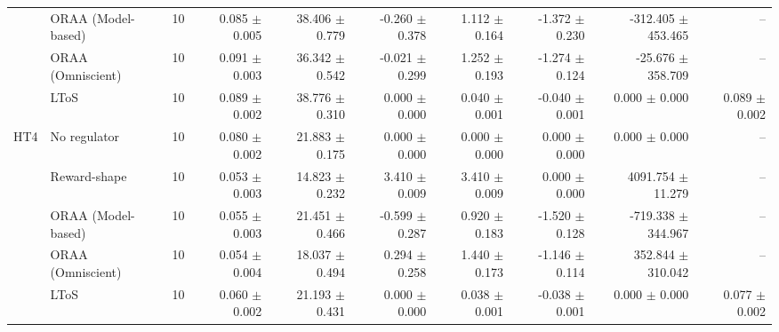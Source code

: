 \begin{tabular}{llrrrrrrrr}
 & ORAA (Model-based) & 10 & 0.085 $\pm$ 0.005 & 38.406 $\pm$ 0.779 & -0.260 $\pm$ 0.378 & 1.112 $\pm$ 0.164 & -1.372 $\pm$ 0.230 & -312.405 $\pm$ 453.465 & -- \\
 & ORAA (Omniscient) & 10 & 0.091 $\pm$ 0.003 & 36.342 $\pm$ 0.542 & -0.021 $\pm$ 0.299 & 1.252 $\pm$ 0.193 & -1.274 $\pm$ 0.124 & -25.676 $\pm$ 358.709 & -- \\
 & LToS & 10 & 0.089 $\pm$ 0.002 & 38.776 $\pm$ 0.310 & 0.000 $\pm$ 0.000 & 0.040 $\pm$ 0.001 & -0.040 $\pm$ 0.001 & 0.000 $\pm$ 0.000 & 0.089 $\pm$ 0.002 \\
\addlinespace
HT4 & No regulator & 10 & 0.080 $\pm$ 0.002 & 21.883 $\pm$ 0.175 & 0.000 $\pm$ 0.000 & 0.000 $\pm$ 0.000 & 0.000 $\pm$ 0.000 & 0.000 $\pm$ 0.000 & -- \\
 & Reward-shape & 10 & 0.053 $\pm$ 0.003 & 14.823 $\pm$ 0.232 & 3.410 $\pm$ 0.009 & 3.410 $\pm$ 0.009 & 0.000 $\pm$ 0.000 & 4091.754 $\pm$ 11.279 & -- \\
 & ORAA (Model-based) & 10 & 0.055 $\pm$ 0.003 & 21.451 $\pm$ 0.466 & -0.599 $\pm$ 0.287 & 0.920 $\pm$ 0.183 & -1.520 $\pm$ 0.128 & -719.338 $\pm$ 344.967 & -- \\
 & ORAA (Omniscient) & 10 & 0.054 $\pm$ 0.004 & 18.037 $\pm$ 0.494 & 0.294 $\pm$ 0.258 & 1.440 $\pm$ 0.173 & -1.146 $\pm$ 0.114 & 352.844 $\pm$ 310.042 & -- \\
 & LToS & 10 & 0.060 $\pm$ 0.002 & 21.193 $\pm$ 0.431 & 0.000 $\pm$ 0.000 & 0.038 $\pm$ 0.001 & -0.038 $\pm$ 0.001 & 0.000 $\pm$ 0.000 & 0.077 $\pm$ 0.002 \\
\bottomrule
\end{tabular}
